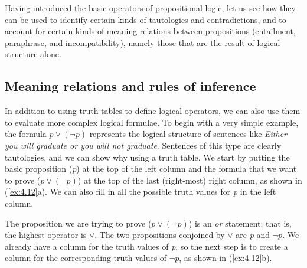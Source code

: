 Having introduced the basic operators of propositional logic, let us see how they can be used to identify certain kinds of tautologies and contradictions, and to account for certain kinds of meaning relations between propositions (entailment, paraphrase, and incompatibility), namely those that are the result of logical structure alone.


\subsection{Meaning relations and rules of inference}\label{sec:4.3.2}

In addition to using truth tables to define logical operators, we can also use them to evaluate more complex logical formulae. To begin with a very simple example, the formula $p\vee (\neg p)$ represents the logical structure of sentences like \textit{Either you will graduate or you will not graduate}. Sentences of this type are clearly tautologies, and we can show why using a truth table. We start by putting the basic proposition (\textit{p}) at the top of the left column and the formula that we want to prove ($p\vee (\neg p)$) at the top of the last (right-most) right column, as shown in (\ref{ex:4.12}a). We can also fill in all the possible truth values for \textit{p} in the left column.


\ea \label{ex:4.12}
 \z

The proposition we are trying to prove ($p\vee (\neg p)$) is an \textit{or} statement; that is, the highest operator is $\vee$. The two propositions conjoined by $\vee$ are \textit{p} and $\neg p$. We already have a column for the truth values of \textit{p}, so the next step is to create a column for the corresponding truth values of $\neg p$, as shown in (\ref{ex:4.12}b).

\setcounter{equation}{11}

